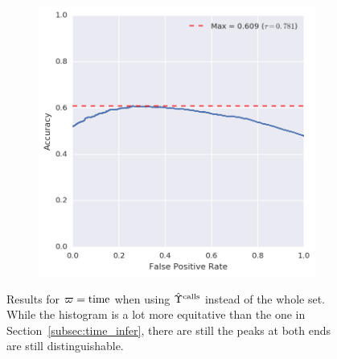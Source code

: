 \begin{figure}[!h]
\begin{subfigure}[b]{.49\textwidth}
	\includegraphics[height=.175\textheight]{figures/bayes/least1/accuracy_time.png}
\end{subfigure}
\caption{Results for $\varpi = \operatorname{time}$ when using $\hat{\Upsilon}^{\operatorname{calls}}$ instead of the whole set. While the histogram is a lot more equitative than the one in Section~\ref{subsec:time_infer}, there are still the peaks at both ends are still distinguishable.}
\label{fig:time_infer_positive}
\end{figure}

